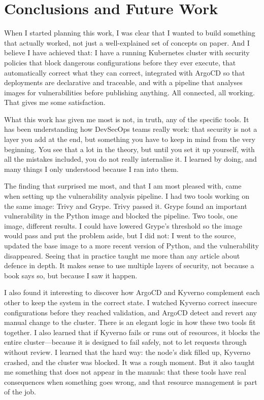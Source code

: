 \chapter{Conclusions and Future Work}

When I started planning this work, I was clear that I wanted to build something that actually worked, not just a well-explained set of concepts on paper. And I believe I have achieved that: I have a running Kubernetes cluster with security policies that block dangerous configurations before they ever execute, that automatically correct what they can correct, integrated with ArgoCD so that deployments are declarative and traceable, and with a pipeline that analyses images for vulnerabilities before publishing anything. All connected, all working. That gives me some satisfaction.

What this work has given me most is not, in truth, any of the specific tools. It has been understanding how DevSecOps teams really work: that security is not a layer you add at the end, but something you have to keep in mind from the very beginning. You see that a lot in the theory, but until you set it up yourself, with all the mistakes included, you do not really internalise it. I learned by doing, and many things I only understood because I ran into them.

The finding that surprised me most, and that I am most pleased with, came when setting up the vulnerability analysis pipeline. I had two tools working on the same image: Trivy and Grype. Trivy passed it. Grype found an important vulnerability in the Python image and blocked the pipeline. Two tools, one image, different results. I could have lowered Grype's threshold so the image would pass and put the problem aside, but I did not: I went to the source, updated the base image to a more recent version of Python, and the vulnerability disappeared. Seeing that in practice taught me more than any article about defence in depth. It makes sense to use multiple layers of security, not because a book says so, but because I saw it happen.

I also found it interesting to discover how ArgoCD and Kyverno complement each other to keep the system in the correct state. I watched Kyverno correct insecure configurations before they reached validation, and ArgoCD detect and revert any manual change to the cluster. There is an elegant logic in how these two tools fit together. I also learned that if Kyverno fails or runs out of resources, it blocks the entire cluster---because it is designed to fail safely, not to let requests through without review. I learned that the hard way: the node's disk filled up, Kyverno crashed, and the cluster was blocked. It was a rough moment. But it also taught me something that does not appear in the manuals: that these tools have real consequences when something goes wrong, and that resource management is part of the job.

